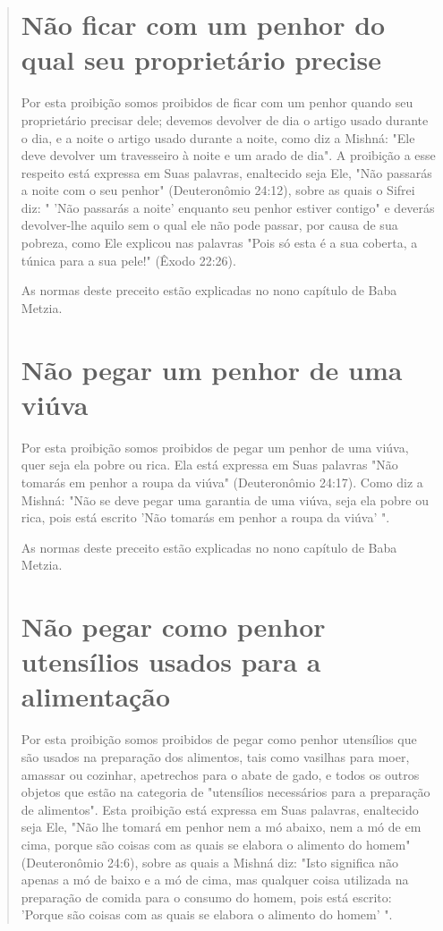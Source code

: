 \begin{quote}

\section{Não ficar com um penhor do qual seu proprietário precise}

Por esta proibição somos proibidos de ficar com um penhor quan­do seu
proprietário precisar dele; devemos devolver de dia o artigo usado
du­rante o dia, e a noite o artigo usado durante a noite, como diz a
Mishná: "Ele deve devolver um travesseiro à noite e um arado de dia". A
proibição a esse respeito está expressa em Suas palavras, enaltecido
seja Ele, "Não passarás a noite com o seu penhor" (Deuteronômio 24:12),
sobre as quais o Sifrei diz: " 'Não passarás a noite' enquanto seu
penhor estiver contigo" e deverás devolver-lhe aquilo sem o qual ele não
pode passar, por causa de sua pobreza, como Ele explicou nas palavras
"Pois só esta é a sua coberta, a túnica para a sua pele!" (Êxodo 22:26).

As normas deste preceito estão explicadas no nono capítulo de Baba
Metzia.

\section{Não pegar um penhor de uma viúva}

Por esta proibição somos proibidos de pegar um penhor de uma viú­va,
quer seja ela pobre ou rica. Ela está expressa em Suas palavras "Não
tomarás em penhor a roupa da viúva" (Deuteronômio 24:17). Como diz a
Mishná: "Não se deve pegar uma garantia de uma viúva, seja ela pobre ou
rica, pois está escri­to 'Não tomarás em penhor a roupa da viúva' ".

As normas deste preceito estão explicadas no nono capítulo de Baba
Metzia.

\section{Não pegar como penhor utensílios usados para a alimentação}

Por esta proibição somos proibidos de pegar como penhor utensí­lios que
são usados na preparação dos alimentos, tais como vasilhas para moer,
amassar ou cozinhar, apetrechos para o abate de gado, e todos os outros
obje­tos que estão na categoria de "utensílios necessários para a
preparação de ali­mentos". Esta proibição está expressa em Suas
palavras, enaltecido seja Ele, "Não lhe tomará em penhor nem a mó
abaixo, nem a mó de em cima, porque são coisas com as quais se elabora o
alimento do homem" (Deuteronômio 24:6), sobre as quais a Mishná diz:
"Isto significa não apenas a mó de baixo e a mó de cima, mas qualquer
coisa utilizada na preparação de comida para o consu­mo do homem, pois
está escrito: 'Porque são coisas com as quais se elabora o alimento do
homem' ".


\end{quote}
